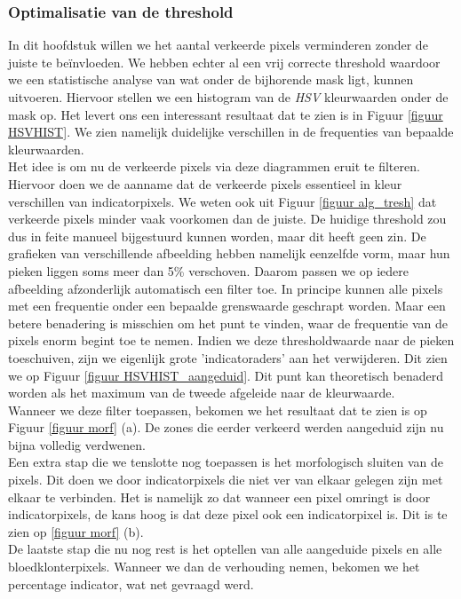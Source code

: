 \documentclass[a4paper,kulak]{kulakarticle}
\begin{document}
\subsubsection{Optimalisatie van de threshold}
In dit hoofdstuk willen we het aantal verkeerde pixels verminderen zonder de juiste te beïnvloeden. We hebben echter al een vrij correcte threshold waardoor we een statistische analyse van wat onder de bijhorende mask ligt, kunnen uitvoeren. Hiervoor stellen we een histogram van de \textit{HSV} kleurwaarden onder de mask op. Het levert ons een interessant resultaat dat te zien is in Figuur  \ref{figuur HSVHIST}. We zien namelijk duidelijke verschillen in de frequenties van bepaalde kleurwaarden.\\
Het idee is om nu de verkeerde pixels via deze diagrammen eruit te filteren. Hiervoor doen we de aanname dat de verkeerde pixels essentieel in kleur verschillen van indicatorpixels. We weten ook uit Figuur \ref{figuur alg_tresh} dat verkeerde pixels minder vaak voorkomen dan de juiste. De huidige threshold zou dus in feite manueel bijgestuurd kunnen worden, maar dit heeft geen zin. De grafieken van verschillende afbeelding hebben namelijk eenzelfde vorm, maar hun pieken liggen soms meer dan 5\% verschoven. Daarom passen we op iedere afbeelding afzonderlijk automatisch een filter toe. In principe kunnen alle pixels met een frequentie onder een bepaalde grenswaarde geschrapt worden. Maar een betere benadering is misschien om het punt te vinden, waar de frequentie van de pixels enorm begint toe te nemen. Indien we deze thresholdwaarde naar de pieken toeschuiven, zijn we eigenlijk grote 'indicatoraders' aan het verwijderen. Dit zien we op Figuur \ref{figuur HSVHIST_aangeduid}. Dit punt kan theoretisch benaderd worden als het maximum van de tweede afgeleide naar de kleurwaarde. \\
Wanneer we deze filter toepassen, bekomen we het resultaat dat te zien is op Figuur \ref{figuur morf} (a). De zones die eerder verkeerd werden aangeduid zijn nu bijna volledig verdwenen.\\
Een extra stap die we tenslotte nog toepassen is het morfologisch sluiten van de pixels. Dit doen we door indicatorpixels die niet ver van elkaar gelegen zijn met elkaar te verbinden. Het is namelijk zo dat wanneer een pixel omringt is door indicatorpixels, de kans hoog is dat deze pixel ook een indicatorpixel is. Dit is te zien op \ref{figuur morf} (b).\\
De laatste stap die nu nog rest is het optellen van alle aangeduide pixels en alle bloedklonterpixels. Wanneer we dan de verhouding nemen, bekomen we het percentage indicator, wat net gevraagd werd.
\end{document}
